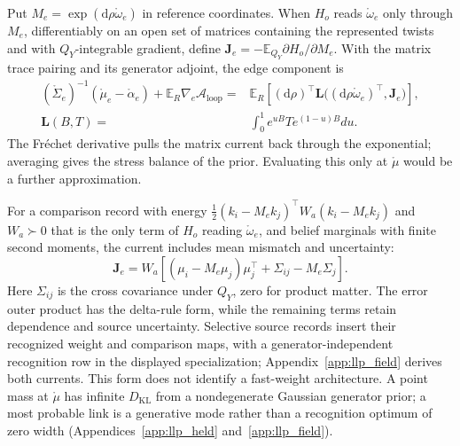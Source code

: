 Put $M_e=\exp(\mathrm d\rho\mathring\omega_e)$ in reference coordinates. When $H_o$ reads
$\mathring\omega_e$ only through $M_e$, differentiably on an open set of matrices containing
the represented twists and with $Q_Y$-integrable gradient, define
$\mathbf J_e=-\mathbb E_{Q_Y}\partial H_o/\partial M_e$. With the matrix trace pairing
and its generator adjoint, the edge component is
\begin{equation}
\begin{split}
(\mathring\Sigma_e)^{-1}(\mathring\mu_e-\mathring\alpha_e)
+\mathbb E_R\nabla_e\mathcal A_{\mathrm{loop}}
={}&\mathbb E_R\left[(\mathrm d\rho)^\top
\mathbf L\bigl((\mathrm d\rho\mathring\omega_e)^\top,\mathbf J_e\bigr)\right],\\
\mathbf L(B,T)={}&\int_0^1e^{uB}Te^{(1-u)B}du.
\end{split}
\label{eq:latent_link_current}
\end{equation}
The Fr\'echet derivative pulls the matrix current back through the exponential;
averaging gives the stress balance of the prior. Evaluating this only at
$\mathring\mu$ would be a further approximation.

For a comparison record with energy $\tfrac12(k_i-M_ek_j)^\top W_a(k_i-M_ek_j)$
and $W_a\succ0$ that is the only term of $H_o$ reading $\mathring\omega_e$, and belief
marginals with finite second moments, the current includes mean mismatch and uncertainty:
\begin{equation}
\mathbf J_e=W_a\left[(\mu_i-M_e\mu_j)\mu_j^\top+\Sigma_{ij}-M_e\Sigma_j\right].
\label{eq:latent_link_delta_current}
\end{equation}
Here $\Sigma_{ij}$ is the cross covariance under $Q_Y$, zero for product matter.
The error outer product has the delta-rule form, while the remaining terms retain
dependence and source uncertainty. Selective source records insert their recognized
weight and comparison maps, with a generator-independent recognition row in the
displayed specialization; Appendix~\ref{app:llp_field} derives both currents.
This form does not identify a fast-weight architecture. A point mass at $\mathring\mu$
has infinite $D_{\mathrm{KL}}$ from a nondegenerate Gaussian generator prior; a most
probable link is a generative mode rather than a recognition optimum of zero width
(Appendices~\ref{app:llp_held} and~\ref{app:llp_field}).

